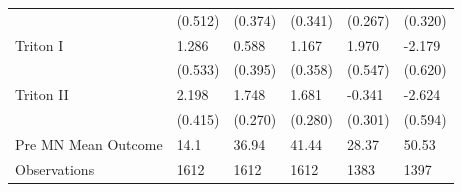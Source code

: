 \begin{tabular}{p{7cm}C{3cm}C{3cm}C{3cm}C{3cm}C{3cm}}
&     (0.512)&     (0.374)&     (0.341)&     (0.267)&     (0.320)\\
Triton I            &       1.286&       0.588&       1.167&       1.970&      -2.179\\
&     (0.533)&     (0.395)&     (0.358)&     (0.547)&     (0.620)\\
Triton II           &       2.198&       1.748&       1.681&      -0.341&      -2.624\\
&     (0.415)&     (0.270)&     (0.280)&     (0.301)&     (0.594)\\
\midrule Pre MN Mean Outcome  & 14.1 & 36.94 & 41.44 & 28.37 & 50.53 \\         
Observations        &        1612&        1612&        1612&        1383&        1397\\
\hline\hline
\end{tabular}%